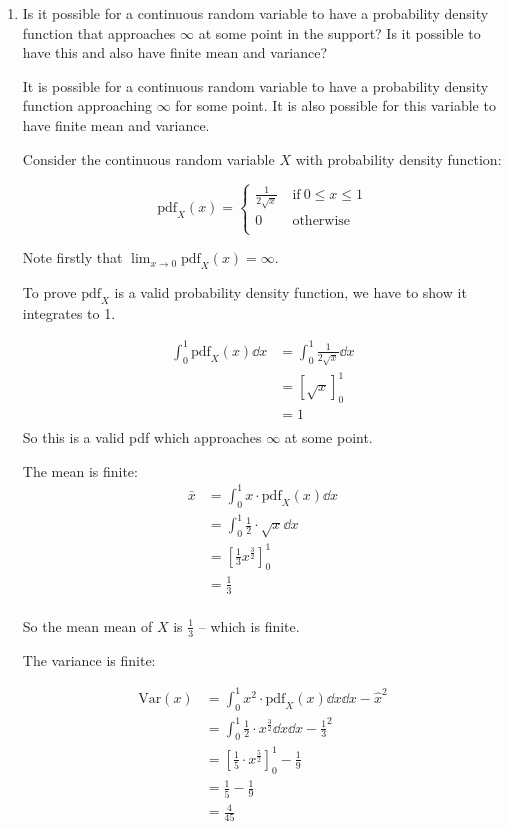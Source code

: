 \documentclass[10pt,\jkfside,a4paper]{article}
\begin{document}
\begin{enumerate}[label=\arabic*]
\begin{itemize}
\end{itemize}

\item Is it possible for a continuous random variable to have a probability
density function that approaches $\infty$ at some point in the support? Is
it possible to have this and also have finite mean and variance?

It is possible for a continuous random variable to have a probability
density function approaching $\infty$ for some point. It is also possible
for this variable to have finite mean and variance.

Consider the continuous random variable $X$ with probability density function:

\[
\text{pdf}_X(x) =
\begin{cases}
\frac{1}{2\sqrt{x}} & \ \text{if} \ 0 \leq x \leq 1 \\
0 & \ \text{otherwise} \\
\end{cases}
\]

Note firstly that $\lim_{x\rightarrow 0} \text{pdf}_X(x) = \infty$.

To prove $\text{pdf}_X$ is a valid probability density function, we have to
show it integrates to 1.

\[
\begin{split}
\int^1_0 \text{pdf}_X(x) \dd{x} &= \int^1_0 \frac{1}{2\sqrt{x}} \dd{x} \\
&= \left[ \sqrt{x} \right]^1_0 \\
&= 1 \\
\end{split}
\]
So this is a valid pdf which approaches $\infty$ at some point.

The mean is finite:
\[
\begin{split}
\bar{x} &= \int^1_0 x \cdot \text{pdf}_X(x) \dd{x} \\
&= \int^1_0 \frac{1}{2} \cdot \sqrt{x} \dd{x} \\
&= \left[ \frac{1}{3} x^{\frac{3}{2}} \right]^1_0 \\
&= \frac{1}{3} \\
\end{split}
\]

So the mean mean of $X$ is $\frac{1}{3}$ -- which is finite.

The variance is finite:

\[
\begin{split}
\text{Var}(x) &= \int^1_0 x^2 \cdot \text{pdf}_X(x) \dd{x} \dd{x} - \hat{x}^2 \\
&= \int^1_0 \frac{1}{2} \cdot x^\frac{3}{2} \dd{x} \dd{x} - \frac{1}{3}^2 \\
&= \left[ \frac{1}{5} \cdot x^{\frac{5}{2}} \right]^1_0 - \frac{1}{9} \\
&= \frac{1}{5} - \frac{1}{9} \\
&= \frac{4}{45} \\
\end{split}
\]


\end{enumerate}
\end{document}
